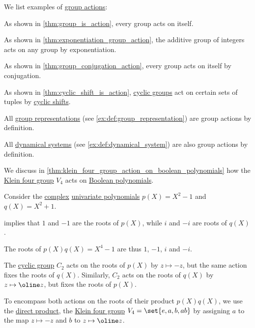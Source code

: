 \begin{example}\label{ex:def:group_action}
  We list examples of \hyperref[def:group_action]{group actions}:
  \begin{thmenum}
     As shown in \cref{thm:group_is_action}, every group acts on itself.

     As shown in \cref{thm:exponentiation_group_action}, the additive group of integers acts on any group by exponentiation.

     As shown in \cref{thm:group_conjugation_action}, every group acts on itself by conjugation.

     As shown in \cref{thm:cyclic_shift_is_action}, \hyperref[def:cyclic_group]{cyclic groups} act on certain sets of tuples by \hyperref[def:cyclic_shift]{cyclic shifts}.

     All \hyperref[def:group_representation]{group representations} (see \cref{ex:def:group_representation}) are group actions by definition.

     All \hyperref[def:dynamical_system]{dynamical systems} (see \cref{ex:def:dynamical_system}) are also group actions by definition.

     We discuss in \cref{thm:klein_four_group_action_on_boolean_polynomials} how the \hyperref[def:klein_four_group]{Klein four group} \( V_4 \) acts on \hyperref[def:free_boolean_algebra/polynomial]{Boolean polynomials}.

     Consider the \hyperref[def:complex_numbers]{complex} \hyperref[def:univariate_polynomial]{univariate polynomials} \( p(X) = X^2 - 1 \) and \( q(X) = X^2 + 1 \).

     implies that \( 1 \) and \( -1 \) are the roots of \( p(X) \), while \( i \) and \( -i \) are roots of \( q(X) \).

    The roots of \( p(X) q(X) = X^4 - 1 \) are thus \( 1 \), \( -1 \), \( i \) and \( -i \).

    The \hyperref[def:cyclic_group]{cyclic group} \( C_2 \) acts on the roots of \( p(X) \) by \( z \mapsto -z \), but the same action fixes the roots of \( q(X) \). Similarly, \( C_2 \) acts on the roots of \( q(X) \) by \( z \mapsto \oline z \), but fixes the roots of \( p(X) \).

    To encompass both actions on the roots of their product \( p(X) q(X) \), we use the \hyperref[def:fol_direct_product]{direct product}, the \hyperref[def:klein_four_group]{Klein four group} \( V_4 = \set{ e, a, b, ab } \) by assigning \( a \) to the map \( z \mapsto -z \) and \( b \) to \( z \mapsto \oline z \).
  \end{thmenum}
\end{example}

